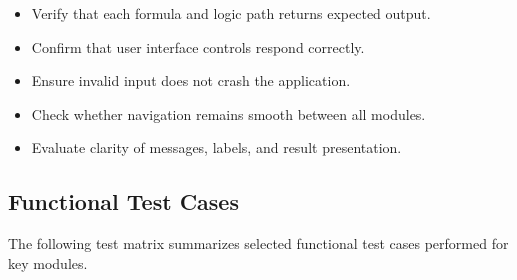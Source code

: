 \documentclass{article}
\begin{document}
\begin{reportbox}
\begin{itemize}
\item Verify that each formula and logic path returns expected output.
\item Confirm that user interface controls respond correctly.
\item Ensure invalid input does not crash the application.
\item Check whether navigation remains smooth between all modules.
\item Evaluate clarity of messages, labels, and result presentation.
\end{itemize}
\end{reportbox}

\subsection{Functional Test Cases}
The following test matrix summarizes selected functional test cases performed for key modules.
\end{document}
